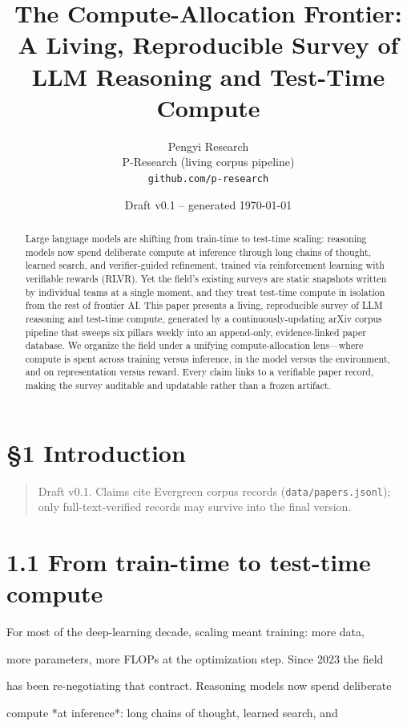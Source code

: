 \documentclass[11pt]{article}
\title{The Compute-Allocation Frontier: A Living, Reproducible Survey of LLM Reasoning and Test-Time Compute}
\author{Pengyi Research\\ \small P-Research (living corpus pipeline) \\ \small \texttt{github.com/p-research}}
\date{Draft v0.1 -- generated \today}
\begin{document}
\maketitle

\begin{abstract}
Large language models are shifting from train-time to test-time scaling: reasoning models now spend deliberate compute at inference through long chains of thought, learned search, and verifier-guided refinement, trained via reinforcement learning with verifiable rewards (RLVR). Yet the field's existing surveys are static snapshots written by individual teams at a single moment, and they treat test-time compute in isolation from the rest of frontier AI. This paper presents a living, reproducible survey of LLM reasoning and test-time compute, generated by a continuously-updating arXiv corpus pipeline that sweeps six pillars weekly into an append-only, evidence-linked paper database. We organize the field under a unifying compute-allocation lens---where compute is spent across training versus inference, in the model versus the environment, and on representation versus reward. Every claim links to a verifiable paper record, making the survey auditable and updatable rather than a frozen artifact.
\end{abstract}

\section*{\S1 Introduction}

\begin{quote}Draft v0.1. Claims cite Evergreen corpus records (\texttt{data/papers.jsonl}); only full-text-verified records may survive into the final version.\end{quote}

\section{1.1 From train-time to test-time compute}

For most of the deep-learning decade, scaling meant training: more data,

more parameters, more FLOPs at the optimization step. Since 2023 the field

has been re-negotiating that contract. Reasoning models now spend deliberate

compute *at inference*: long chains of thought, learned search, and
\end{document}
